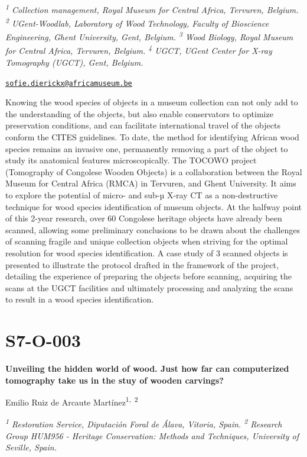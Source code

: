 \documentclass[
]{book}
\begin{document}
\emph{\textsuperscript{1} Collection management, Royal Museum for Central Africa, Tervuren, Belgium. \textsuperscript{2} UGent-Woodlab, Laboratory of Wood Technology, Faculty of Bioscience Engineering, Ghent University, Gent, Belgium. \textsuperscript{3} Wood Biology, Royal Museum for Central Africa, Tervuren, Belgium. \textsuperscript{4} UGCT, UGent Center for X-ray Tomography (UGCT), Gent, Belgium.}

\href{mailto:sofie.dierickx@africamuseum.be}{\nolinkurl{sofie.dierickx@africamuseum.be}}

Knowing the wood species of objects in a museum collection can not only add to the understanding of the objects, but also enable conservators to optimize preservation conditions, and can facilitate international travel of the objects conform the CITES guidelines. To date, the method for identifying African wood species remains an invasive one, permanently removing a part of the object to study its anatomical features microscopically. The TOCOWO project (Tomography of Congolese Wooden Objects) is a collaboration between the Royal Museum for Central Africa (RMCA) in Tervuren, and Ghent University. It aims to explore the potential of micro- and sub-µ X-ray CT as a non-destructive technique for wood species identification of museum objects. At the halfway point of this 2-year research, over 60 Congolese heritage objects have already been scanned, allowing some preliminary conclusions to be drawn about the challenges of scanning fragile and unique collection objects when striving for the optimal resolution for wood species identification. A case study of 3 scanned objects is presented to illustrate the protocol drafted in the framework of the project, detailing the experience of preparing the objects before scanning, acquiring the scans at the UGCT facilities and ultimately processing and analyzing the scans to result in a wood species identification.

\hypertarget{s7-o-003}{%
\section*{S7-O-003}\label{s7-o-003}}

\textbf{Unveiling the hidden world of wood. Just how far can computerized tomography take us in the stuy of wooden carvings?}

Emilio Ruiz de Arcaute Martínez\textsuperscript{1,~2}

\emph{\textsuperscript{1} Restoration Service, Diputación Foral de Álava, Vitoria, Spain. \textsuperscript{2} Research Group HUM956 - Heritage Conservation: Methods and Techniques, University of Seville, Spain.}
\end{document}
